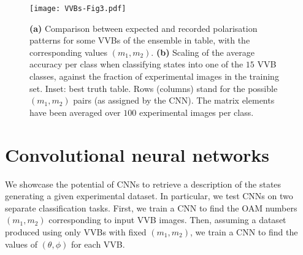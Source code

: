 \begin{figure}[tb]
    \centering
    \texttt{[image: VVBs-Fig3.pdf]}
    \caption{
	    \textbf{(a)} Comparison between expected and recorded polarisation patterns for some \acp{VVB} of the ensemble in table, with the corresponding values $(m_1,m_2)$.
	    \textbf{(b)} Scaling of the average accuracy per class when classifying states into one of the $15$ VVB classes,
	    against the fraction of experimental images in the training set. 
	    Inset: best truth table.
	    Rows (columns) stand for the possible $(m_1,m_2)$ pairs (as assigned by the CNN). The matrix elements have been averaged over $100$ experimental images per class.
    }%
    \label{fig:VVBs:resultsCNN}
\end{figure}



\section{Convolutional neural networks}
\label{sec:VVBs:CNNs}

We showcase the potential of \acp{CNN} to retrieve a description of the states generating a given experimental dataset.
In particular, we test CNNs on two separate classification tasks.
First, we train a CNN to find the OAM numbers $(m_1,m_2)$ corresponding to input VVB images. Then, assuming a dataset produced using only VVBs with fixed $(m_1,m_2)$, we train a CNN to find the values of $(\theta,\phi)$ for each VVB.

